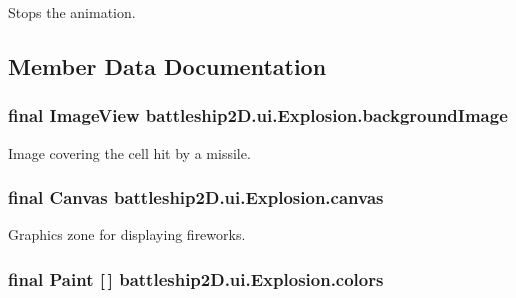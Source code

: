 Stops the animation. 



\subsection{Member Data Documentation}
\hypertarget{classbattleship2D_1_1ui_1_1Explosion_aec53964ab689b670e6e25b23669aaf70}{
\subsubsection[{background\-Image}]{\setlength{\rightskip}{0pt plus 5cm}final Image\-View battleship2\-D.\-ui.\-Explosion.\-background\-Image\hspace{0.3cm}{\ttfamily [private]}}}\label{classbattleship2D_1_1ui_1_1Explosion_aec53964ab689b670e6e25b23669aaf70}


Image covering the cell hit by a missile. 

\hypertarget{classbattleship2D_1_1ui_1_1Explosion_a7df261722990b64d7ef22ba25786bb54}{
\subsubsection[{canvas}]{\setlength{\rightskip}{0pt plus 5cm}final Canvas battleship2\-D.\-ui.\-Explosion.\-canvas\hspace{0.3cm}{\ttfamily [private]}}}\label{classbattleship2D_1_1ui_1_1Explosion_a7df261722990b64d7ef22ba25786bb54}


Graphics zone for displaying fireworks. 

\hypertarget{classbattleship2D_1_1ui_1_1Explosion_ac77ea2908aa3d5de71096df02623a018}{
\subsubsection[{colors}]{\setlength{\rightskip}{0pt plus 5cm}final Paint \mbox{[}$\,$\mbox{]} battleship2\-D.\-ui.\-Explosion.\-colors\hspace{0.3cm}{\ttfamily [private]}}}\label{classbattleship2D_1_1ui_1_1Explosion_ac77ea2908aa3d5de71096df02623a018}



